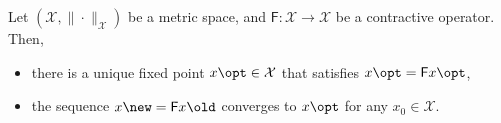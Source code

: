 \begin{theorem} 
\label{thm: banach fixed point}
Let $(\mathcal{X}, \|\cdot\|_\mathcal{X})$ be a metric space, and $\mathsf{F} : \mathcal{X} \to \mathcal{X}$ be a contractive operator. Then,
\begin{itemize}
    \item there is a unique fixed point $x\opt \in \mathcal{X}$ that satisfies $x\opt = \mathsf{F} x\opt$,
    
    \item the sequence $x\new = \mathsf{F} x\old$ converges to $x\opt$ for any $x_0 \in \mathcal{X}$.
\end{itemize}
\end{theorem}